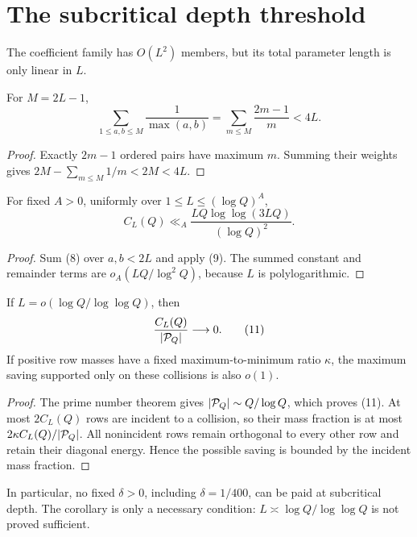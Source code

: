 \section{The subcritical depth threshold}

The coefficient family has \(O(L^2)\) members, but its total parameter length
is only linear in \(L\).
\begin{lemma}
For \(M=2L-1\),
\[
 \sum_{1\le a,b\le M}\frac1{\max(a,b)}
 =\sum_{m\le M}\frac{2m-1}{m}<4L. \tag{9}
\]
\end{lemma}
\begin{proof}
Exactly \(2m-1\) ordered pairs have maximum \(m\).  Summing their weights
gives \(2M-\sum_{m\le M}1/m<2M<4L\).
\end{proof}

\begin{theorem}
For fixed \(A>0\), uniformly over \(1\le L\le(\log Q)^A\),
\[
 C_L(Q)\ll_A
 \frac{LQ\log\log(3LQ)}{(\log Q)^2}. \tag{10}
\]
\end{theorem}
\begin{proof}
Sum (8) over \(a,b<2L\) and apply (9).  The summed constant and remainder
terms are \(o_A(LQ/\log^2Q)\), because \(L\) is polylogarithmic.
\end{proof}

\begin{corollary}
If \(L=o(\log Q/\log\log Q)\), then
\[
 \frac{C_L(Q)}{|\mathcal P_Q|}\longrightarrow0. \tag{11}
\]
If positive row masses have a fixed maximum-to-minimum ratio \(\kappa\), the
maximum saving supported only on these collisions is also \(o(1)\).
\end{corollary}
\begin{proof}
The prime number theorem gives \(|\mathcal P_Q|\sim Q/\log Q\), which proves (11).
At most \(2C_L(Q)\) rows are incident to a collision, so their mass fraction
is at most \(2\kappa C_L(Q)/|\mathcal P_Q|\).  All nonincident rows remain
orthogonal to every other row and retain their diagonal energy.  Hence the
possible saving is bounded by the incident mass fraction.
\end{proof}

In particular, no fixed \(\delta>0\), including \(\delta=1/400\), can be paid
at subcritical depth.  The corollary is only a necessary condition:
\(L\asymp\log Q/\log\log Q\) is not proved sufficient.
